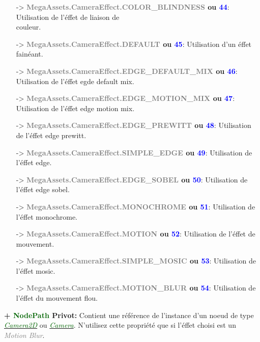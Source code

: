 \documentclass[a4paper, 11pt]{article}
\begin{document}
\begin{itemize}
		\item [-> \textbf{\textcolor{gray}{MegaAssets.CameraEffect.COLOR\_BLINDNESS} ou \textcolor{blue}
		{44}}:] Utilisation de l'éffet de liaison de \\couleur.
		\item [-> \textbf{\textcolor{gray}{MegaAssets.CameraEffect.DEFAULT} ou \textcolor{blue}{45}}:] 
		Utilisation d'un éffet fainéant.
		\item [-> \textbf{\textcolor{gray}{MegaAssets.CameraEffect.EDGE\_DEFAULT\_MIX} ou \textcolor{blue}
		{46}}:] Utilisation de l'éffet egde default mix.
		\item [-> \textbf{\textcolor{gray}{MegaAssets.CameraEffect.EDGE\_MOTION\_MIX} ou \textcolor{blue}
		{47}}:] Utilisation de l'éffet edge motion mix.
		\item [-> \textbf{\textcolor{gray}{MegaAssets.CameraEffect.EDGE\_PREWITT} ou \textcolor{blue}{48}}:]
		Utilisation de l'éffet edge prewitt.
		\item [-> \textbf{\textcolor{gray}{MegaAssets.CameraEffect.SIMPLE\_EDGE} ou \textcolor{blue}{49}}:] 
		Utilisation de l'éffet edge.
		\item [-> \textbf{\textcolor{gray}{MegaAssets.CameraEffect.EDGE\_SOBEL} ou \textcolor{blue}{50}}:] 
		Utilisation de l'éffet edge sobel.
		\item [-> \textbf{\textcolor{gray}{MegaAssets.CameraEffect.MONOCHROME} ou \textcolor{blue}{51}}:] 
		Utilisation de l'éffet monochrome.
		\item [-> \textbf{\textcolor{gray}{MegaAssets.CameraEffect.MOTION} ou \textcolor{blue}{52}}:] 
		Utilisation de l'éffet de mouvement.
		\item [-> \textbf{\textcolor{gray}{MegaAssets.CameraEffect.SIMPLE\_MOSIC} ou \textcolor{blue}{53}}:]
		Utilisation de l'éffet mosic.
		\item [-> \textbf{\textcolor{gray}{MegaAssets.CameraEffect.MOTION\_BLUR} ou \textcolor{blue}{54}}:] 
		Utilisation de l'éffet du mouvement flou.\\
	\end{itemize}
	\textbf{+ \textcolor{darkgreen}{NodePath} Privot:} Contient une référence de l'instance d'un noeud de 
	type \href{https://docs.godotengine.org/en/stable/classes/class_camera2d.html}
	{\textit{\textcolor{darkgreen}{Camera2D}}} ou
	\href{https://docs.godotengine.org/en/stable/classes/class_camera.html}
	{\textit{\textcolor{darkgreen}{Camera}}}. N'utilisez cette propriété que si l'éffet choisi est un 
	\textit{\textcolor{gray}{Motion Blur}}.\\\\
\end{document}
